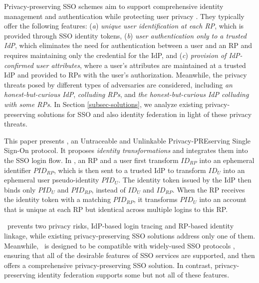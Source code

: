 Privacy-preserving SSO schemes aim to support comprehensive identity management and authentication while protecting user privacy \cite{maler2008venn, NIST2017draft, BrowserID, SPRESSO}.
They typically offer the following features:
(\emph{a}) \emph{unique user identification at each RP}, which is provided through SSO identity tokens,
(\emph{b}) \emph{user authentication only to a trusted IdP},
which eliminates the need for authentication between a user and an RP and requires maintaining only the credential for the IdP,
and (\emph{c}) \emph{provision of IdP-confirmed user attributes},
 where a user's attributes are maintained at a trusted IdP and provided to RPs with the user's authorization.
Meanwhile, the privacy threats posed by different types of adversaries are considered, including \emph{an honest-but-curious IdP}, \emph{colluding RPs}, and \emph{the honest-but-curious IdP colluding with some RPs}.
In Section \ref{subsec-solutions}, we analyze existing privacy-preserving solutions for SSO and also identity federation in light of these privacy threats.


This paper presents \usso, an Untraceable and Unlinkable Privacy-PREserving Single Sign-On protocol.
It proposes {\em identity transformations} and integrates them into the SSO login flow.
In \usso, an RP and a user first transform $ID_{RP}$ into an ephemeral identifier $PID_{RP}$, which is then sent to a trusted IdP to transform $ID_U$ into an ephemeral user pseudo-identity $PID_U$.
The identity token issued by the IdP then binds only $PID_U$ and $PID_{RP}$, instead of $ID_U$ and $ID_{RP}$. When the RP receives the identity token with a matching $PID_{RP}$, it transforms $PID_U$ into an account that is unique at each RP but identical across multiple logins to this RP.


\usso\ prevents two privacy risks, IdP-based login tracing and RP-based identity linkage, while existing privacy-preserving SSO solutions \cite{BrowserID, SPRESSO, NIST2017draft, FirefoxAccount} address only one of them. Meanwhile, \usso\ is designed to be compatible with widely-used SSO protocols \cite{OpenIDConnect, rfc6749, SAML, NIST2017draft}, ensuring that all of the desirable features of SSO services are supported, and then offers a comprehensive privacy-preserving SSO solution.
In contrast, privacy-preserving identity federation \cite{PseudoID, ELPASSO, UnlimitID, Opaak, uprov, hyperledge-idemix} supports some but not all of these features.

